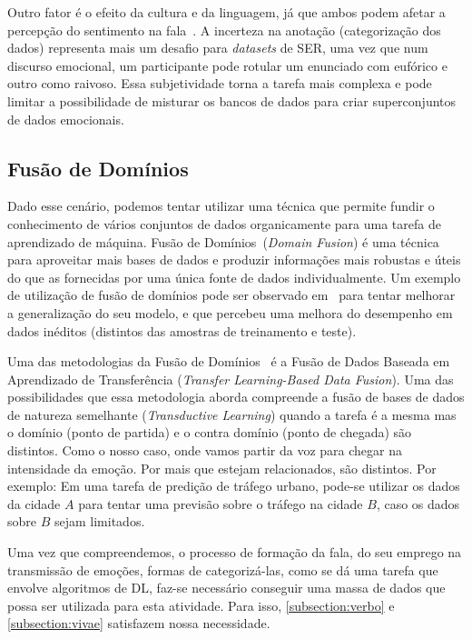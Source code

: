 Outro fator é o efeito da cultura e da linguagem, já que ambos podem afetar a percepção do sentimento na fala~\cite{32}. A incerteza na anotação (categorização dos dados) representa mais um desafio para \textit{datasets} de \acrshort{SER}, uma vez que num discurso emocional, um participante pode rotular um enunciado com eufórico e outro como raivoso. Essa subjetividade torna a tarefa mais complexa e pode limitar a possibilidade de misturar os bancos de dados para criar superconjuntos de dados emocionais.

\subsection{Fusão de Domínios}

Dado esse cenário, podemos tentar utilizar uma técnica que permite fundir o conhecimento de vários conjuntos de dados organicamente para uma tarefa de aprendizado de máquina. Fusão de Domínios~\cite{49}(\textit{Domain Fusion}) é uma técnica para aproveitar mais bases de dados e produzir informações mais robustas e úteis do que as fornecidas por uma única fonte de dados individualmente. Um exemplo de utilização de fusão de domínios pode ser observado em~\cite{3} para tentar melhorar a generalização do seu modelo, e que percebeu uma melhora do desempenho em dados inéditos (distintos das amostras de treinamento e teste).

Uma das metodologias da Fusão de Domínios~\cite{49} é a Fusão de Dados Baseada em Aprendizado de Transferência (\textit{Transfer Learning-Based Data Fusion}). Uma das possibilidades que essa metodologia aborda compreende a fusão de bases de dados de natureza semelhante (\textit{Transductive Learning}) quando a tarefa é a mesma mas o domínio (ponto de partida) e o contra domínio (ponto de chegada) são distintos. Como o nosso caso, onde vamos partir da voz para chegar na intensidade da emoção. Por mais que estejam relacionados, são distintos. Por exemplo: Em uma tarefa de predição de tráfego urbano, pode-se utilizar os dados da cidade $A$ para tentar uma previsão sobre o tráfego na cidade $B$, caso os dados sobre $B$ sejam limitados. 

Uma vez que compreendemos, o processo de formação da fala, do seu emprego na transmissão de emoções, formas de categorizá-las, como se dá uma tarefa que envolve algoritmos de \acrshort{DL}, faz-se necessário conseguir uma massa de dados que possa ser utilizada para esta atividade. Para isso, \ref{subsection:verbo} e \ref{subsection:vivae} satisfazem nossa necessidade.

